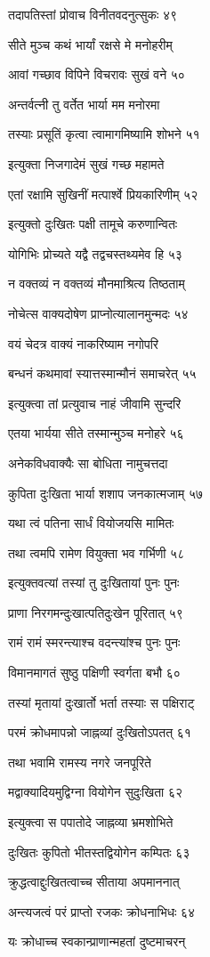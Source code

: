 तदापतिस्तां प्रोवाच विनीतवदनुत्सुकः ४९

सीते मुञ्च कथं भार्यां रक्षसे मे मनोहरीम्

आवां गच्छाव विपिने विचरावः सुखं वने ५०

अन्तर्वत्नी तु वर्तेत भार्या मम मनोरमा

तस्याः प्रसूतिं कृत्वा त्वामागमिष्यामि शोभने ५१

इत्युक्ता निजगादेमं सुखं गच्छ महामते

एतां रक्षामि सुखिनीं मत्पार्श्वे प्रियकारिणीम् ५२

इत्युक्तो दुःखितः पक्षी तामूचे करुणान्वितः

योगिभिः प्रोच्यते यद्वै तद्वचस्तथ्यमेव हि ५३

न वक्तव्यं न वक्तव्यं मौनमाश्रित्य तिष्ठताम्

नोचेत्स वाक्यदोषेण प्राप्नोत्यालानमुन्मदः ५४

वयं चेदत्र वाक्यं नाकरिष्याम नगोपरि

बन्धनं कथमावां स्यात्तस्मान्मौनं समाचरेत् ५५

इत्युक्त्वा तां प्रत्युवाच नाहं जीवामि सुन्दरि

एतया भार्यया सीते तस्मान्मुञ्च मनोहरे ५६

अनेकविधवाक्यैः सा बोधिता नामुचत्तदा

कुपिता दुःखिता भार्या शशाप जनकात्मजाम् ५७

यथा त्वं पतिना सार्धं वियोजयसि मामितः

तथा त्वमपि रामेण वियुक्ता भव गर्भिणी ५८

इत्युक्तवत्यां तस्यां तु दुःखितायां पुनः पुनः

प्राणा निरगमन्दुःखात्पतिदुःखेन पूरितात् ५९

रामं रामं स्मरन्त्याश्च वदन्त्यांश्च पुनः पुनः

विमानमागतं सुष्ठु पक्षिणी स्वर्गता बभौ ६०

तस्यां मृतायां दुःखार्तो भर्ता तस्याः स पक्षिराट्

परमं क्रोधमापन्नो जाह्नव्यां दुःखितोऽपतत् ६१

तथा भवामि रामस्य नगरे जनपूरिते

मद्वाक्यादियमुद्विग्ना वियोगेन सुदुःखिता ६२

इत्युक्त्वा स पपातोदे जाह्नव्या भ्रमशोभिते

दुःखितः कुपितो भीतस्तद्वियोगेन कम्पितः ६३

क्रुद्धत्वाद्दुःखितत्वाच्च सीताया अपमाननात्

अन्त्यजत्वं परं प्राप्तो रजकः क्रोधनाभिधः ६४

यः क्रोधाच्च स्वकान्प्राणान्महतां दुष्टमाचरन्

